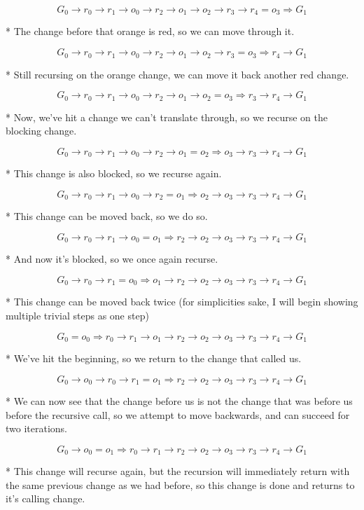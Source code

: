 \documentclass{article}
\newcommand{\insetarrow}[1]{=#1\Rightarrow}
\begin{document}
\[G_0\to r_0\to r_1\to o_0 
\to r_2\to o_1\to o_2\to r_3 
\to r_4\insetarrow{o_3} G_1\]

* The change before that orange is red, 
so we can move through it.

\[G_0\to r_0\to r_1\to o_0 
\to r_2\to o_1\to o_2\to r_3 
\insetarrow{o_3} r_4 \to G_1\]

* Still recursing on the orange change, 
we can move it back another red change.

\[G_0\to r_0\to r_1\to o_0 
\to r_2\to o_1\to o_2 \insetarrow{o_3} 
r_3 \to r_4 \to G_1\]

* Now, we've hit a change we can't translate through, 
so we recurse on the blocking change.

\[G_0\to r_0\to r_1\to o_0 
\to r_2\to o_1\insetarrow{o_2} o_3 
\to r_3 \to r_4 \to G_1\]

* This change is also blocked, 
so we recurse again.

\[G_0\to r_0\to r_1\to o_0 
\to r_2\insetarrow{o_1} o_2 \to o_3 
\to r_3 \to r_4 \to G_1\]

* This change can be moved back, 
so we do so.

\[G_0\to r_0\to r_1\to o_0 
\insetarrow{o_1} r_2 \to o_2 \to o_3 
\to r_3 \to r_4 \to G_1\]

* And now it's blocked, 
so we once again recurse.

\[G_0\to r_0\to r_1\insetarrow{o_0} 
o_1\to r_2 \to o_2 \to o_3 
\to r_3 \to r_4 \to G_1\]

* This change can be moved back twice 
(for simplicities sake, 
I will begin showing multiple trivial steps as one step)

\[G_0\insetarrow{o_0}r_0\to r_1 
\to o_1\to r_2 \to o_2 \to o_3 
\to r_3\to r_4 \to G_1\]

* We've hit the beginning, 
so we return to the change that called us.

\[G_0\to o_0\to r_0\to r_1 
\insetarrow{o_1} r_2 \to o_2 \to o_3 
\to r_3\to r_4 \to G_1\]

* We can now see that the change before us 
is not the change that was before us 
before the recursive call, 
so we attempt to move backwards, 
and can succeed for two iterations.

\[G_0\to o_0\insetarrow{o_1} r_0
\to r_1 \to r_2 \to o_2 \to o_3 
\to r_3\to r_4 \to G_1\]

* This change will recurse again, 
but the recursion will immediately return 
with the same previous change 
as we had before, 
so this change is done 
and returns to it's calling change.
\end{document}
